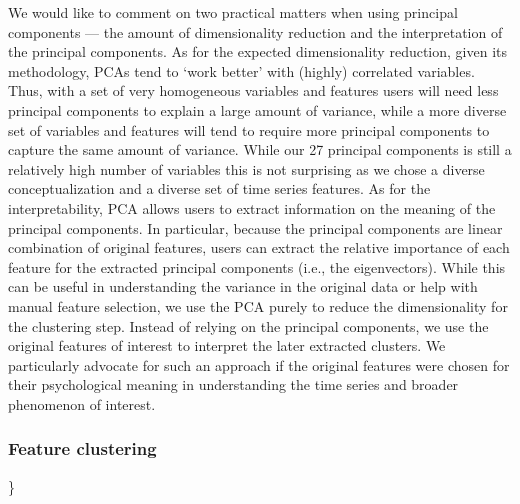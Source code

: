 We would like to comment on two practical matters when using principal
components --- the amount of dimensionality reduction and the
interpretation of the principal components. As for the expected
dimensionality reduction, given its methodology, PCAs tend to `work
better' with (highly) correlated variables. Thus, with a set of very
homogeneous variables and features users will need less principal
components to explain a large amount of variance, while a more diverse
set of variables and features will tend to require more principal
components to capture the same amount of variance. While our 27
principal components is still a relatively high number of variables this
is not surprising as we chose a diverse conceptualization and a diverse
set of time series features. As for the interpretability, PCA allows
users to extract information on the meaning of the principal components.
In particular, because the principal components are linear combination
of original features, users can extract the relative importance of each
feature for the extracted principal components (i.e., the eigenvectors).
While this can be useful in understanding the variance in the original
data or help with manual feature selection, we use the PCA purely to
reduce the dimensionality for the clustering step. Instead of relying on
the principal components, we use the original features of interest to
interpret the later extracted clusters. We particularly advocate for
such an approach if the original features were chosen for their
psychological meaning in understanding the time series and broader
phenomenon of interest.

\subsubsection{Feature clustering}

\}

